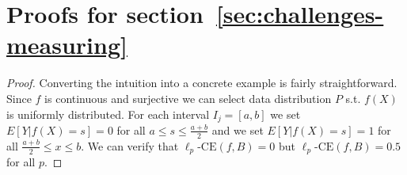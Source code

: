\section{Proofs for section~\ref{sec:challenges-measuring}}
\label{sec:appendix-platt-not-calibrated}


\continuousNotCalibrated*

\begin{proof}
Converting the intuition into a concrete example is fairly straightforward. Since $f$ is continuous and surjective we can select data distribution $P$ s.t. $f(X)$ is uniformly distributed.
For each interval $I_j = [a, b]$ we set $E[Y | f(X) = s] = 0$ for all $a \leq s \leq \frac{a+b}{2}$ and we set $E[Y | f(X) = s] = 1$ for all $\frac{a+b}{2} \leq x \leq b$.
We can verify that $\ell_p\mbox{-CE}(f, B) = 0$ but $\ell_p\mbox{-CE}(f, B) = 0.5$ for all $p$.
\end{proof}


\binningLowerBound*


